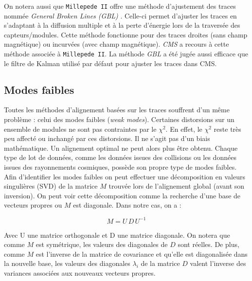   \medskip

  On notera aussi que \texttt{Millepede II} offre une m\'ethode d'ajustement des traces nomm\'ee \textit{General Broken Lines (GBL)} \cite{Kleinwort:2012np}. Celle-ci permet d'ajuster les traces en s'adaptant \`a la diffusion multiple et \`a la perte d'\'energie lors de la travers\'ee des capteurs/modules. Cette m\'ethode fonctionne pour des traces droites (sans champ magn\'etique) ou incurv\'ees (avec champ magn\'etique). \textit{CMS} \cite{Chatrchyan:2014wfa} \cite{Schleper:2008zz} a recours \`a cette m\'ethode associ\'ee \`a \texttt{Millepede II}. La m\'ethode \textit{GBL} a \'et\'e jug\'ee aussi efficace que le filtre de Kalman utilis\'e par d\'efaut pour ajuster les traces dans CMS.  

   \subsection{Modes faibles}
   
   Toutes les m\'ethodes d'alignement bas\'ees sur les traces souffrent d'un m\^eme probl\`eme : celui des modes faibles (\textit{weak modes}). Certaines distorsions sur un ensemble de modules ne sont pas contraintes par le $\chi^2$. En effet, le $\chi^2$ reste tr\`es peu affect\'e ou inchang\'e par ces distorsions. Il ne s'agit pas d'un biais math\'ematique. Un alignement optimal ne peut alors plus \^etre obtenu. Chaque type de lot de donn\'ees, comme les donn\'ees issues des collisions ou les donn\'ees issues des rayonnements cosmiques, poss\`ede son propre type de modes faibles. Afin d'identifier les modes faibles on peut effectuer une d\'ecomposition en valeurs singuli\`eres (SVD) de la matrice $M$ trouv\'ee lors de l'alignement global (avant son inversion). On peut voir cette d\'ecomposition comme la recherche d'une base de vecteurs propres ou $M$ est diagonale. Dans notre cas, on a :  
   
   \begin{equation}
    M = U \, D \, U^{-1}
   \end{equation} 
   
   Avec U une matrice orthogonale et D une matrice diagonale. On notera que comme $M$ est sym\'etrique, les valeurs des diagonales de $D$ sont r\'eelles. De plus, comme $M$ est l'inverse de la matrice de covariance et qu'elle est diagonalis\'ee dans la nouvelle base, les valeurs des diagonales $\lambda_i$ de la matrice $D$ valent l'inverse des variances associ\'ees aux nouveaux vecteurs propres.
   
